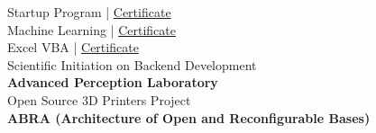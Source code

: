 
Startup Program \hfill| {\color{link_blue} \href{https://e-certificado.com/login/visualizar?c=664024A5B7D718B4639950}{Certificate}}
\vspace{0.1em}\\
Machine Learning \hfill|  {\color{link_blue} \href{https://cursos.alura.com.br/degree/certificate/98f57b77-ffe3-4062-b69c-7259b0fd74c6}{Certificate}}
\vspace{0.1em}\\
Excel VBA \hfill| {\color{link_blue} \href{https://cursos.alura.com.br/degree/certificate/68d6f5b3-3a07-4fac-9f6b-f42f04e131ca}{Certificate}}
\vspace{0.7em}\\
Scientific Initiation on Backend Development\\\textbf{Advanced Perception Laboratory}
\vspace{0.7em}\\
Open Source 3D Printers Project\\\textbf{ABRA (Architecture of Open and Reconfigurable Bases)}
